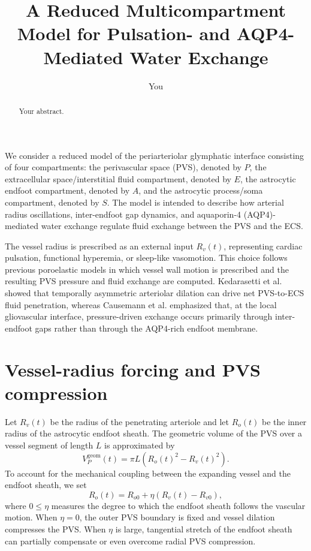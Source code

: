 \documentclass{article}
\title{A Reduced Multicompartment Model for Pulsation- and AQP4-Mediated Water Exchange}
\author{You}
\begin{document}
\maketitle

\begin{abstract}
Your abstract.
\end{abstract}

 

We consider a reduced model of the periarteriolar glymphatic interface consisting of four compartments:
the perivascular space (PVS), denoted by \(P\), the extracellular space/interstitial fluid compartment,
denoted by \(E\), the astrocytic endfoot compartment, denoted by \(A\), and the astrocytic process/soma
compartment, denoted by \(S\). The model is intended to describe how arterial radius oscillations,
inter-endfoot gap dynamics, and aquaporin-4 (AQP4)-mediated water exchange regulate fluid exchange
between the PVS and the ECS.

The vessel radius is prescribed as an external input \(R_v(t)\), representing cardiac pulsation,
functional hyperemia, or sleep-like vasomotion. This choice follows previous poroelastic models in
which vessel wall motion is prescribed and the resulting PVS pressure and fluid exchange are computed.
Kedarasetti et al. showed that temporally asymmetric arteriolar dilation can drive net PVS-to-ECS
fluid penetration, whereas Causemann et al. emphasized that, at the local gliovascular interface,
pressure-driven exchange occurs primarily through inter-endfoot gaps rather than through the
AQP4-rich endfoot membrane. 


\section{Vessel-radius forcing and PVS compression}

Let \(R_v(t)\) be the radius of the penetrating arteriole and let \(R_o(t)\) be the inner radius of the
astrocytic endfoot sheath. The geometric volume of the PVS over a vessel segment of length \(L\) is
approximated by
\begin{equation}
    V_P^{\mathrm{geom}}(t)
    =
    \pi L \left( R_o(t)^2 - R_v(t)^2 \right).
\end{equation}
To account for the mechanical coupling between the expanding vessel and the endfoot sheath, we set
\begin{equation}
    R_o(t)
    =
    R_{o0}
    +
    \eta \left( R_v(t)-R_{v0} \right),
\end{equation}
where \(0\leq \eta\) measures the degree to which the endfoot sheath follows the vascular motion.
When \(\eta=0\), the outer PVS boundary is fixed and vessel dilation compresses the PVS. When
\(\eta\) is large, tangential stretch of the endfoot sheath can partially compensate or even overcome
radial PVS compression.
\end{document}
